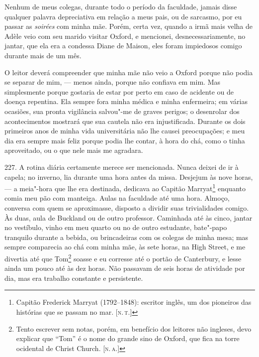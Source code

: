 Nenhum de meus colegas, durante todo o período da faculdade, jamais
disse qualquer palavra depreciativa em relação a meus pais, ou de
sarcasmo, por eu passar as \emph{soirées} com minha mãe. Porém, certa
vez, quando a irmã mais velha de Adèle veio com seu marido visitar
Oxford, e mencionei, desnecessariamente, no jantar, que ela era a
condessa Diane de Maison, eles foram impiedosos comigo durante mais de
um mês.

O leitor deverá compreender que minha mãe não veio a Oxford porque não
podia se separar de mim, --- menos ainda, porque não confiava em mim. Mas
simplesmente porque gostaria de estar por perto em caso de acidente ou
de doença repentina. Ela sempre fora minha médica e minha enfermeira; em
várias ocasiões, sua pronta vigilância salvou"-me de graves perigos; o
desenrolar dos acontecimentos mostrará que sua cautela não era
injustificada. Durante os dois primeiros anos de minha vida
universitária não lhe causei preocupações; e meu dia era sempre mais
feliz porque podia lhe contar, à hora do chá, como o tinha aproveitado,
ou o que nele mais me agradara.

227. A rotina diária certamente merece ser mencionada. Nunca deixei de
ir à capela; no inverno, lia durante uma hora antes da missa. Desjejum
às nove horas, --- a meia"-hora que lhe era destinada, dedicava ao Capitão
Marryat\footnote{Capitão Frederick Marryat (1792--1848): escritor inglês,
  um dos pioneiros das histórias que se passam no mar. {[}\textsc{n.\,t.}{]}}
enquanto comia meu pão com manteiga. Aulas na faculdade até uma hora.
Almoço, conversa com quem se aproximasse, disposto a dividir suas
trivialidades comigo. Às duas, aula de Buckland ou de outro professor.
Caminhada até às cinco, jantar no vestíbulo, vinho em meu quarto ou no
de outro estudante, bate"-papo tranquilo durante a bebida, ou
brincadeiras com os colegas de minha mesa; mas sempre comparecia ao chá
com minha mãe, às sete horas, na High Street, e me divertia até que
Tom\footnote{Tento escrever sem notas, porém, em benefício dos leitores
  não ingleses, devo explicar que ``Tom'' é o nome do grande sino de
  Oxford, que fica na torre ocidental de Christ Church. {[}\textsc{n.\,a.}{]}}
soasse e eu corresse até o portão de Canterbury, e lesse ainda um pouco
até às dez horas. Não passavam de seis horas de atividade por dia, mas
era trabalho constante e persistente.

